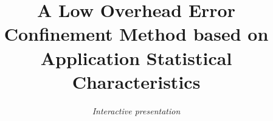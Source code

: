 \documentclass[10pt, conference]{IEEEtran}
\renewcommand{\baselinestretch}{0.81}
\begin{document}
\title{A Low Overhead Error Confinement Method based on Application Statistical Characteristics}

\author{\textit{Interactive presentation}}

\maketitle


\IEEEpeerreviewmaketitle



%



\scriptsize
\renewcommand{\baselinestretch}{0.85}


\end{document}
